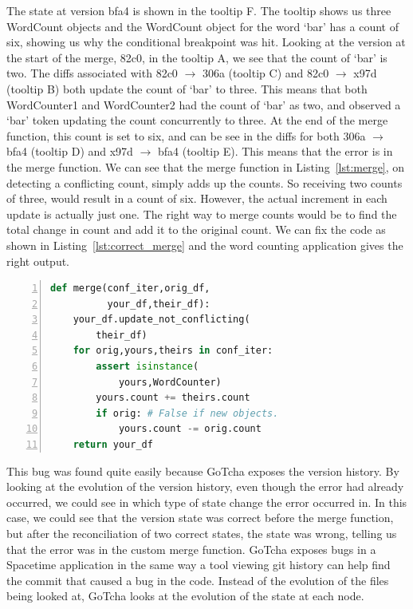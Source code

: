 The state at version bfa4 is shown in the tooltip F. The tooltip shows us three WordCount objects and the WordCount object for the word `bar' has a count of six, showing us why the conditional breakpoint was hit. Looking at the version at the start of the merge, 82c0, in the tooltip A, we see that the count of `bar' is two. The diffs associated with 82c0 $\rightarrow$ 306a (tooltip C) and 82c0 $\rightarrow$ x97d (tooltip B) both update the count of `bar' to three. This means that both WordCounter1 and WordCounter2 had the count of `bar' as two, and observed a `bar' token updating the count concurrently to three. At the end of the merge function, this count is set to six, and can be see in the diffs for both 306a $\rightarrow$ bfa4 (tooltip D) and x97d $\rightarrow$ bfa4 (tooltip E). This means that the error is in the merge function. We can see that the merge function in Listing~\ref{lst:merge}, on detecting a conflicting count, simply adds up the counts. So receiving two counts of three, would result in a count of six. However, the actual increment in each update is actually just one. The right way to merge counts would be to find the total change in count and add it to the original count. We can fix the code as shown in Listing~\ref{lst:correct_merge} and the word counting application gives the right output.

\begin{lstlisting}[language=Python,basicstyle=\small, numbers=left,
label=lst:correct_merge, captionpos=b, caption=Merge function used at the Grouper node.]
def merge(conf_iter,orig_df,
          your_df,their_df):
    your_df.update_not_conflicting(
        their_df)
    for orig,yours,theirs in conf_iter:
        assert isinstance(
            yours,WordCounter)
        yours.count += theirs.count
        if orig: # False if new objects.
            yours.count -= orig.count
    return your_df
\end{lstlisting}

This bug was found quite easily because GoTcha exposes the version history. By looking at the evolution of the version history, even though the error had already occurred, we could see in which type of state change the error occurred in. In this case, we could see that the version state was correct before the merge function, but after the reconciliation of two correct states, the state was wrong, telling us that the error was in the custom merge function. GoTcha exposes bugs in a Spacetime application in the same way a tool viewing git history can help find the commit that caused a bug in the code. Instead of the evolution of the files being looked at, GoTcha looks at the evolution of the state at each node.